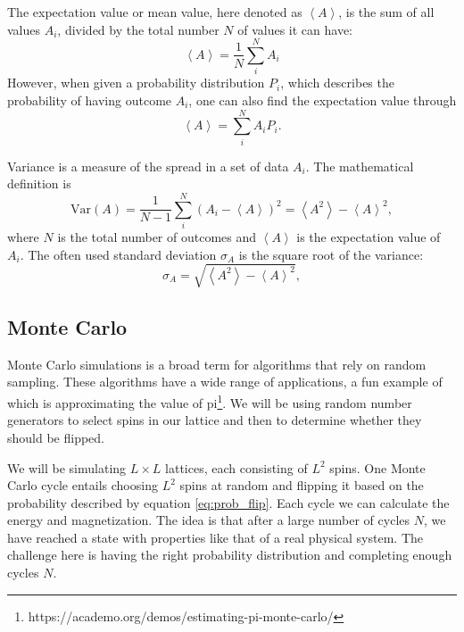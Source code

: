 \documentclass[reprint, english,notitlepage,nofootinbib]{revtex4-1}  %
\begin{document}
The expectation value or mean value, here denoted as $\left<A\right>$, is the sum of all values $A_i$, divided by the total number $N$ of values it can have:
\begin{equation*}
	\left< A \right> = \frac{1}{N}\sum_{i}^{N}A_i
\end{equation*}
However, when given a probability distribution $P_i$, which describes the probability of having outcome $A_i$, one can also find the expectation value through
\begin{equation*}
	\left<A\right> = \sum_{i}^{N}A_iP_i.
\end{equation*}

Variance is a measure of the spread in a set of data $A_i$. The mathematical definition is
\begin{equation*}
	\mathrm{Var}(A) = \frac{1}{N-1} \sum_{i}^{N} (A_i - \left<A\right>)^2 = \left<A^2\right> - \left<A\right>^2,
\end{equation*}
where $N$ is the total number of outcomes and $\left<A\right>$ is the expectation value of $A_i$.
The often used standard deviation $\sigma_A$ is the square root of the variance:
\begin{equation*}
	\sigma_A = \sqrt{\left<A^2\right> - \left<A\right>^2},
\end{equation*}

\subsection*{Monte Carlo}

Monte Carlo simulations is a broad term for algorithms that rely on random sampling. These algorithms have a wide range of applications, a fun example of which is approximating the value of pi\footnote{https://academo.org/demos/estimating-pi-monte-carlo/}. We will be using random number generators to select spins in our lattice and then to determine whether they should be flipped.

We will be simulating $L \times L$ lattices, each consisting of $L^2$ spins. One Monte Carlo cycle entails choosing $L^2$ spins at random and flipping it based on the probability described by equation \eqref{eq:prob_flip}. Each cycle we can calculate the energy and magnetization. The idea is that after a large number of cycles $N$, we have reached a state with properties like that of a real physical system. The challenge here is having the right probability distribution and completing enough cycles $N$.
\end{document}
